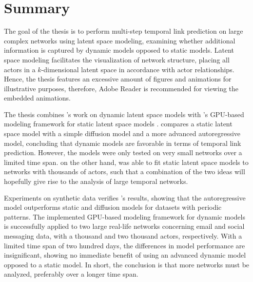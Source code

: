 \chapter{Summary}

The goal of the thesis is to perform multi-step temporal link prediction on large complex networks using latent space modeling, examining whether additional information is captured by dynamic models opposed to static models.
Latent space modeling facilitates the visualization of network structure, placing all actors in a $k$-dimensional latent space in accordance with actor relationships. Hence, the thesis features an excessive amount of figures and animations for illustrative purposes, therefore, Adobe Reader is recommended for viewing the embedded animations.

The thesis combines \citeauthor{zangenberg2018a}'s work on dynamic latent space models \cite{zangenberg2018a} with \citeauthor{jacobsen2018a}'s GPU-based modeling framework for static latent space models \cite{jacobsen2018a}. \citeauthor{zangenberg2018a} compares a static latent space model with a simple diffusion model and a more advanced autoregressive model, concluding that dynamic models are favorable in terms of temporal link prediction. However, the models were only tested on very small networks over a limited time span. \citeauthor{jacobsen2018a} on the other hand, was able to fit static latent space models to networks with thousands of actors, such that a combination of the two ideas will hopefully give rise to the analysis of large temporal networks.

Experiments on synthetic data verifies \citeauthor{zangenberg2018a}'s results, showing that the autoregressive model outperforms static and diffusion models for datasets with periodic patterns.
The implemented GPU-based modeling framework for dynamic models is successfully applied to two large real-life networks concerning email and social messaging data, with a thousand and two thousand actors, respectively.
With a limited time span of two hundred days, the differences in model performance are insignificant, showing no immediate benefit of using an advanced dynamic model opposed to a static model. In short, the conclusion is that more networks must be analyzed, preferably over a longer time span.



